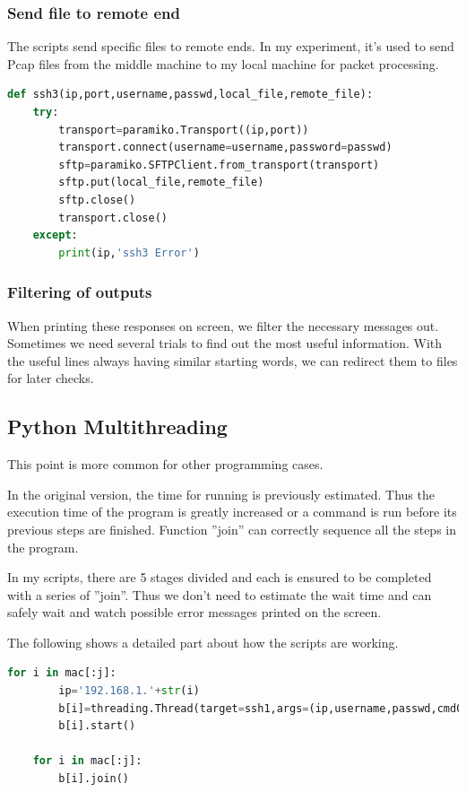 \documentclass[12pt,a4paper]{article}
\begin{document}
\subsubsection{Send file to remote end}
The scripts send specific files to remote ends.
In my experiment, it's used to send Pcap files from the middle machine to my local machine for packet processing.

\begin{lstlisting}[language=Python]
def ssh3(ip,port,username,passwd,local_file,remote_file):
    try:
        transport=paramiko.Transport((ip,port))
        transport.connect(username=username,password=passwd)
        sftp=paramiko.SFTPClient.from_transport(transport)
        sftp.put(local_file,remote_file)
        sftp.close()
        transport.close()
    except:
        print(ip,'ssh3 Error')
\end{lstlisting}

\subsubsection{Filtering of outputs}
When printing these responses on screen, we filter the necessary messages out.
Sometimes we need several trials to find out the most useful information.
With the useful lines always having similar starting words, we can redirect them to files for later checks.

\subsection{Python Multithreading}

This point is more common for other programming cases.

In the original version, the time for running is previously estimated.
Thus the execution time of the program is greatly increased or a command is run before its previous steps are finished.
Function ''join'' can correctly sequence all the steps in the program.

In my scripts, there are 5 stages divided and each is ensured to be completed with a series of ''join''.
Thus we don't need to estimate the wait time and can safely wait and watch possible error messages printed on the screen.

The following shows a detailed part about how the scripts are working.

\begin{lstlisting}[language=Python]
    for i in mac[:j]:
        ip='192.168.1.'+str(i)
        b[i]=threading.Thread(target=ssh1,args=(ip,username,passwd,cmd0))
        b[i].start()

    for i in mac[:j]:
        b[i].join()
\end{lstlisting}
\end{document}
